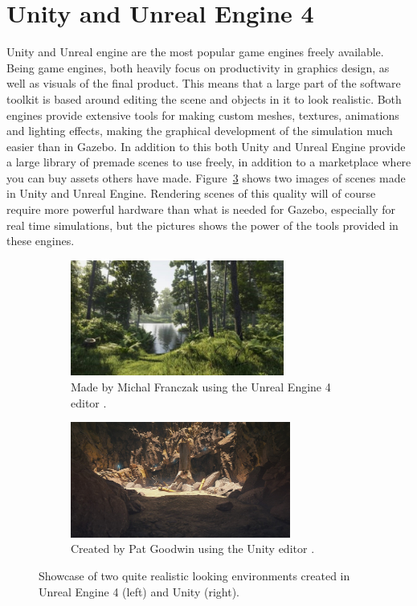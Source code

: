 \section{Unity and Unreal Engine 4} \label{sec: UnityUnreal}

Unity and Unreal engine are the most popular game engines freely available. Being game engines, both heavily focus on productivity in graphics design, as well as visuals of the final product. This means that a large part of the software toolkit is based around editing the scene and objects in it to look realistic. Both engines provide extensive tools for making custom meshes, textures, animations and lighting effects, making the graphical development of the simulation much easier than in Gazebo. In addition to this both Unity and Unreal Engine provide a large library of premade scenes to use freely, in addition to a marketplace where you can buy assets others have made. Figure~\ref{fig:showcase_unityunreal} shows two images of scenes made in Unity and Unreal Engine. Rendering scenes of this quality will of course require more powerful hardware than what is needed for Gazebo, especially for real time simulations, but the pictures shows the power of the tools provided in these engines. 

\begin{figure}[!htb]
    \centering
    \begin{subfigure}{0.45\textwidth}
        \includegraphics[height=3.8cm]{rapport/fig/Simulator/unrealforest.jpg}
        \caption{Made by Michal Franczak using the Unreal Engine 4 editor \cite{Unrealshowcase}.}
        \label{fig:unreal_forest}
    \end{subfigure}
    \begin{subfigure}{0.45\textwidth}
        \includegraphics[height=3.8cm]{rapport/fig/Simulator/unitycave.jpg}
        \caption{Created by Pat Goodwin using the Unity editor \cite{Unityshowcase}.}
        \label{fig:Unity_cave}
    \end{subfigure}
    \caption{Showcase of two quite realistic looking environments created in Unreal Engine 4 (left) and Unity (right).}
    \label{fig:showcase_unityunreal}
\end{figure}

